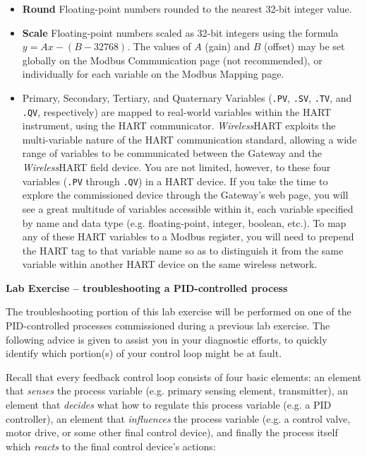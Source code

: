 \begin{itemize}
\begin{itemize}
\item{} {\bf Round} Floating-point numbers rounded to the nearest 32-bit integer value.
\item{} {\bf Scale} Floating-point numbers scaled as 32-bit integers using the formula $y = Ax - (B - 32768)$.  The values of $A$ (gain) and $B$ (offset) may be set globally on the Modbus Communication page (not recommended), or individually for each variable on the Modbus Mapping page.
\vskip 5pt
\item{} Primary, Secondary, Tertiary, and Quaternary Variables ({\tt .PV}, {\tt .SV}, {\tt .TV}, and {\tt .QV}, respectively) are mapped to real-world variables within the HART instrument, using the HART communicator.  {\sl Wireless}HART exploits the multi-variable nature of the HART communication standard, allowing a wide range of variables to be communicated between the Gateway and the {\sl Wireless}HART field device.  You are not limited, however, to these four variables ({\tt .PV} through {\tt .QV}) in a HART device.  If you take the time to explore the commissioned device through the Gateway's web page, you will see a great multitude of variables accessible within it, each variable specified by name and data type (e.g. floating-point, integer, boolean, etc.).  To map any of these HART variables to a Modbus register, you will need to prepend the HART tag to that variable name so as to distinguish it from the same variable within another HART device on the same wireless network.
\end{itemize}










\vfil \eject

\noindent
{\bf Lab Exercise -- troubleshooting a PID-controlled process}

\vskip 10pt

The troubleshooting portion of this lab exercise will be performed on one of the PID-controlled processes commissioned during a previous lab exercise.  The following advice is given to assist you in your diagnostic efforts, to quickly identify which portion(s) of your control loop might be at fault.

\vskip 10pt

Recall that every feedback control loop consists of four basic elements: an element that {\it senses} the process variable (e.g. primary sensing element, transmitter), an element that {\it decides} what how to regulate this process variable (e.g. a PID controller), an element that {\it influences} the process variable (e.g. a control valve, motor drive, or some other final control device), and finally the process itself which {\it reacts} to the final control device's actions:


\end{itemize}
